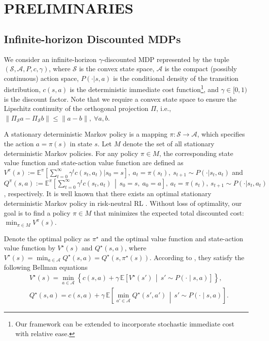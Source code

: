 \documentclass[letterpaper, 10 pt, conference]{ieeeconf}  %
\begin{document}
\section{PRELIMINARIES}\label{sec:pre}
\subsection{Infinite-horizon Discounted MDPs}

We consider an infinite-horizon $\gamma$-discounted MDP represented by the tuple $(\mathcal S,\mathcal A, P, c, \gamma)$, where $\mathcal S$ is the convex state space, $\mathcal A$ is the compact (possibly continuous) action space, $P(\cdot|s,a)$ is the conditional density of the transition distribution, $c(s,a)$ is the deterministic immediate cost function\footnote{Our framework can be extended to incorporate stochastic immediate cost with relative ease.}, and $\gamma\in[0,1)$ is the discount factor. Note that we require a convex state space to ensure the Lipschitz continuity of the orthogonal projection $\Pi$, i.e., $\|\Pi_{\mathcal S} a - \Pi_{\mathcal S} b\| \le \|a-b\|,\ \forall a,b$.

A stationary deterministic Markov policy is a mapping $\pi:\mathcal S\to\mathcal A$, which specifies the action $a=\pi(s)$ in state $s$. Let $M$ denote the set of all stationary deterministic Markov policies. For any policy $\pi \in M$, the corresponding state value function and state-action value function are defined as
$V^\pi(s):=
\mathbb E^\pi\left[
\sum_{t=0}^{\infty}\gamma^t c(s_t,a_t)|s_0=s\right],\ a_t=\pi(s_t),\ s_{t+1}\sim P(\cdot|s_t,a_t)$
and $Q^\pi(s,a) :=
\mathbb E^\pi\!\left[
\sum_{t=0}^{\infty}\gamma^t c(s_t,a_t)
\,\middle|\, s_0=s,\ a_0=a
\right],\ a_t=\pi(s_t),\ s_{t+1}\sim P(\cdot|s_t,a_t)$, respectively.
It is well known that there exists an optimal stationary deterministic Markov policy in risk-neutral RL \cite{puterman2014markov}. Without loss of optimality, our goal is to find a policy $\pi \in M$ that minimizes the expected total discounted cost: $\min_{\pi\in M} V^{\pi}(s)$.

Denote the optimal policy as $\pi^\star$ and the optimal value function and state-action value function by $V^\star(s)$ and $Q^\star(s,a)$, where $V^\star(s)=\min_{a\in \mathcal A}Q^\star(s,a)=Q^\star(s,\pi^\star(s))$. According to \cite{puterman2014markov}, they satisfy the following Bellman equations 
\begin{align*}
&V^\star(s)
=
\min_{a\in\mathcal A}
\left\{
c(s,a)
+
\gamma\,
\mathbb E\!\left[
V^\star(s')
\,\middle|\, s'\sim P(\cdot\mid s,a)
\right]
\right\},\\
&Q^\star(s,a)=
c(s,a)+\gamma\,
\mathbb E\!\left[
\min_{a'\in\mathcal A} Q^\star(s',a')
\,\middle|\, s'\sim P(\cdot\mid s,a)
\right].
\end{align*}
\end{document}
